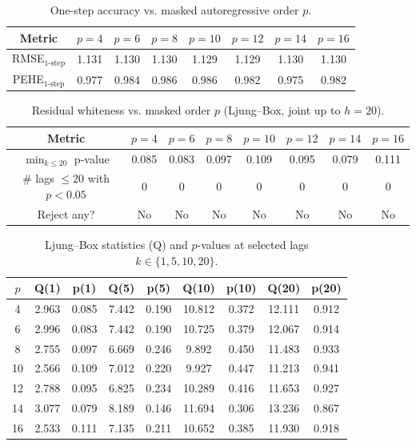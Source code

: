 \documentclass[10pt]{article} %
\begin{document}
\begin{table}[h!]
\centering
\begin{tabular}{c c c c c c c c}
\toprule
Metric & $p=4$ & $p=6$ & $p=8$ & $p=10$ & $p=12$ & $p=14$ & $p=16$ \\
\midrule
RMSE$_{\text{1-step}}$ & 1.131 & 1.130 & 1.130 & 1.129 & 1.129 & 1.130 & 1.130 \\
PEHE$_{\text{1-step}}$ & 0.977 & 0.984 & 0.986 & 0.986 & 0.982 & 0.975 & 0.982 \\
\bottomrule
\end{tabular}
\caption{One-step accuracy vs. masked autoregressive order $p$.}
\label{tab:autoregressive-accuracy}
\end{table}
\begin{table}[h!]
\centering
\begin{tabular}{c c c c c c c c}
\toprule
Metric & $p=4$ & $p=6$ & $p=8$ & $p=10$ & $p=12$ & $p=14$ & $p=16$ \\
\midrule
$\min_{k \leq 20}$ p-value & 0.085 & 0.083 & 0.097 & 0.109 & 0.095 & 0.079 & 0.111 \\
\# lags $\leq 20$ with $p<0.05$ & 0 & 0 & 0 & 0 & 0 & 0 & 0 \\
Reject any? & No & No & No & No & No & No & No \\
\bottomrule
\end{tabular}
\caption{Residual whiteness vs. masked order $p$ (Ljung--Box, joint up to $h=20$).}
\label{tab:ljungbox-summary}
\end{table}


\begin{table}[h!]
\centering
\begin{tabular}{c c c c c c c c c}
\toprule
$p$ & Q(1) & p(1) & Q(5) & p(5) & Q(10) & p(10) & Q(20) & p(20) \\
\midrule
4  & 2.963 & 0.085 & 7.442 & 0.190 & 10.812 & 0.372 & 12.111 & 0.912 \\
6  & 2.996 & 0.083 & 7.442 & 0.190 & 10.725 & 0.379 & 12.067 & 0.914 \\
8  & 2.755 & 0.097 & 6.669 & 0.246 &  9.892 & 0.450 & 11.483 & 0.933 \\
10 & 2.566 & 0.109 & 7.012 & 0.220 &  9.927 & 0.447 & 11.213 & 0.941 \\
12 & 2.788 & 0.095 & 6.825 & 0.234 & 10.289 & 0.416 & 11.653 & 0.927 \\
14 & 3.077 & 0.079 & 8.189 & 0.146 & 11.694 & 0.306 & 13.236 & 0.867 \\
16 & 2.533 & 0.111 & 7.135 & 0.211 & 10.652 & 0.385 & 11.930 & 0.918 \\
\bottomrule
\end{tabular}
\caption{Ljung--Box statistics (Q) and $p$-values at selected lags $k \in \{1,5,10,20\}$.}
\label{tab:ljungbox-details}
\end{table}
\end{document}
